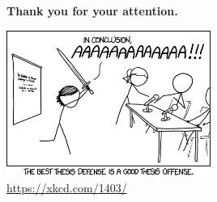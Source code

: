 \documentclass[usenames,dvipsnames,10pt,aspectratio=169]{beamer}
\begin{document}
\begin{frame}
	\begin{center}
		\vspace{1.25cm}
		\huge
		\color{PhDBlue}
		\textbf{Thank you for your attention.}

		\vspace{1cm}

		\includegraphics[width=0.5\textwidth]{graphics/thesis_defense.png}\\
		\small
		\url{https://xkcd.com/1403/}
	\end{center}
\end{frame}






\end{document}
